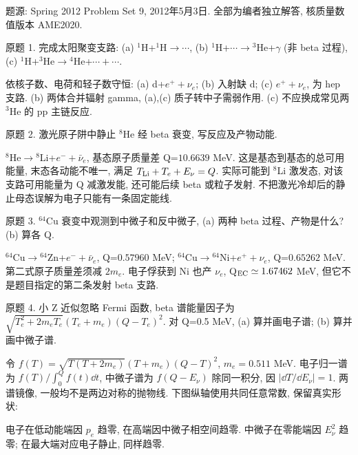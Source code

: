 题源: Spring 2012 Problem Set 9, 2012年5月3日. 全部为编者独立解答, 核质量数值版本 AME2020.
\begin{exercise}\label{ex:2202-9-1}
原题 1. 完成太阳聚变支路: (a) $^1$H+$^1$H$\to\cdots$, (b) $^1$H+$\cdots\to{}^3$He+$\gamma$ (非 beta 过程), (c) $^1$H+$^3$He$\to{}^4$He+$\cdots+\cdots$.
\end{exercise}
\begin{solution}
依核子数、电荷和轻子数守恒: (a) d+$e^++\nu_e$; (b) 入射缺 d; (c) $e^++\nu_e$, 为 hep 支路. (b) 两体合并辐射 gamma, (a),(c) 质子转中子需弱作用. (c) 不应换成常见两 $^3$He 的 pp 主链反应.
\end{solution}
\begin{exercise}\label{ex:2202-9-2}
原题 2. 激光原子阱中静止 $^8$He 经 beta 衰变, 写反应及产物动能.
\end{exercise}
\begin{solution}
$^8$He$\to{}^8$Li+$e^-+\bar\nu_e$, 基态原子质量差 Q=$10.6639$ MeV. 这是基态到基态的总可用能量, 末态各动能不唯一, 满足 $T_{\rm Li}+T_e+E_\nu=Q$. 实际可能到 $^8$Li 激发态, 对该支路可用能量为 Q 减激发能, 还可能后续 beta 或粒子发射. 不把激光冷却后的静止母态误解为电子只能有一条固定能线.
\end{solution}
\begin{exercise}\label{ex:2202-9-3}
原题 3. $^{64}$Cu 衰变中观测到中微子和反中微子, (a) 两种 beta 过程、产物是什么? (b) 算各 Q.
\end{exercise}
\begin{solution}
$^{64}$Cu$\to{}^{64}$Zn+$e^-+\bar\nu_e$, Q=$0.57960$ MeV;
$^{64}$Cu$\to{}^{64}$Ni+$e^++\nu_e$, Q=$0.65262$ MeV. 第二式原子质量差须减 $2m_e$. 电子俘获到 Ni 也产 $\nu_e$, Q$_{\rm EC}\simeq1.67462$ MeV, 但它不是题目指定的第二条发射 beta 支路.
\end{solution}
\begin{exercise}\label{ex:2202-9-4}
原题 4. 小 Z 近似忽略 Fermi 函数, beta 谱能量因子为 $\sqrt{T_e^2+2m_eT_e}(T_e+m_e)(Q-T_e)^2$. 对 Q=0.5 MeV, (a) 算并画电子谱; (b) 算并画中微子谱.
\end{exercise}
\begin{solution}
令 $f(T)=\sqrt{T(T+2m_e)}(T+m_e)(Q-T)^2$, $m_e=0.511$ MeV. 电子归一谱为 $f(T)/\int_0^Qf(t)\dd t$, 中微子谱为 $f(Q-E_\nu)$ 除同一积分, 因 $|\dd T/\dd E_\nu|=1$. 两谱镜像, 一般均不是两边对称的抛物线. 下图纵轴使用共同任意常数, 保留真实形状:
\begin{center}\end{center}
电子在低动能端因 $p_e$ 趋零, 在高端因中微子相空间趋零. 中微子在零能端因 $E_\nu^2$ 趋零; 在最大端对应电子静止, 同样趋零.
\end{solution}

